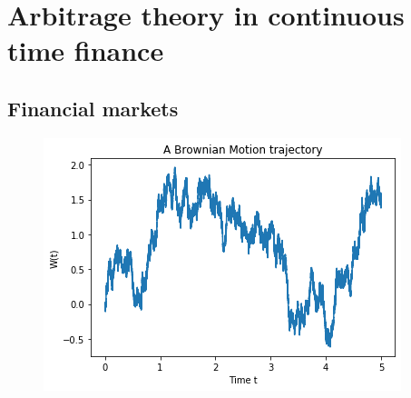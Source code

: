 
\chapter{Arbitrage theory in continuous time finance} %

\label{Chapter2} %


\section{Financial markets}

\begin{figure}[th]
\centering
\includegraphics{Figures/brownianMotion.png}
\decoRule
\caption[A Wiener process trajectory]{}
\label{fig:BM}
\end{figure}

